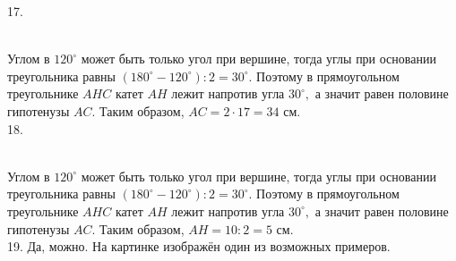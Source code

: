 \documentclass[12pt]{article}
\begin{document}
17. \begin{figure}[ht!]
\end{figure}\\
Углом в $120^\circ$ может быть только угол при вершине, тогда углы при основании треугольника равны $(180^\circ-120^\circ):2=30^\circ.$ Поэтому в прямоугольном треугольнике $AHC$ катет $AH$ лежит напротив угла $30^\circ,$ а значит равен половине гипотенузы $AC.$ Таким образом, $AC=2\cdot17=34$ см.\\
18. \begin{figure}[ht!]
\end{figure}\\
Углом в $120^\circ$ может быть только угол при вершине, тогда углы при основании треугольника равны $(180^\circ-120^\circ):2=30^\circ.$ Поэтому в прямоугольном треугольнике $AHC$ катет $AH$ лежит напротив угла $30^\circ,$ а значит равен половине гипотенузы $AC.$ Таким образом, $AH=10:2=5$ см.\\
19. Да, можно. На картинке изображён один из возможных примеров.
\begin{figure}[ht!]
\end{figure}\\
\end{document}
